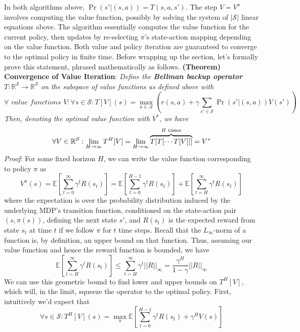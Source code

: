 \documentclass{article}
\begin{document}
In both algorithms above, $ \Pr(s' | (s, a)) = T(s, a, s') $. The step $ V = V^\pi $ involves computing the value function, possibly by solving the system of $ | \mathcal{S} | $ linear equations above. The algorithm essentially computes the value function for the current policy, then updates by re-selecting $ \pi $'s state-action mapping depending on the value function. Both value and policy iteration are guaranteed to converge to the optimal policy in finite time.
\newline \newline
Before wrapping up the section, let's formally prove this statement, phrased mathematically as follows.
\newline \newline
\textbf{(Theorem) Convergence of Value Iteration}: \textit{Define the \textbf{Bellman backup operator} $ T: \mathbb{R}^\mathcal{S} \rightarrow \mathbb{R}^\mathcal{S} $ on the subspace of value functions as defined above with}
    $$ \forall \textit{ value functions } V: \forall s \in \mathcal{S}: T[V](s) = \max_{a \in \mathcal{A}} \left( r(s, a) + \gamma \sum_{s' \in \mathcal{S}} \Pr(s' | (s, a)) V(s') \right) $$
\textit{Then, denoting the optimal value function with $ V^* $, we have}
    $$ \forall V \in \mathbb{R}^\mathcal{S}: \lim_{H \to \infty} T^H[V] = \lim_{H \to \infty} \overbrace{T[T[\cdots T[V]]]}^\text{$ H $ times} = V^* $$
\indent \textit{Proof}: For some fixed horizon $ H $, we can write the value function corresponding to policy $ \pi $ as
    $$ V^\pi(s) = \mathbb{E} \left[ \sum_{t = 0}^\infty \gamma^t R(s_t) \right] = \mathbb{E} \left[ \sum_{t = 0}^{H - 1} \gamma^t R(s_t) \right] + \mathbb{E} \left[ \sum_{t = H}^\infty \gamma^t R(s_t) \right] $$
where the expectation is over the probability distribution induced by the underlying MDP's transition function, conditioned on the state-action pair $ (s, \pi(s)) $, defining the next state $ s' $, and $ R(s_t) $ is the expected reward from state $ s_t $ at time $ t $ if we follow $ \pi $ for $ t $ time steps. Recall that the $ L_\infty $-norm of a function is, by definition, an upper bound on that function. Thus, assuming our value function and hence the reward function is bounded, we have
    $$ \mathbb{E} \left[ \sum_{t = H}^\infty \gamma^t R(s_t) \right] \leq \sum_{t = H}^\infty \gamma^t || R ||_\infty = \frac{\gamma^H}{1 - \gamma} || R ||_\infty $$
We can use this geometric bound to find lower and upper bounds on $ T^H[V] $, which will, in the limit, squeeze the operator to the optimal policy. First, intuitively we'd expect that
    $$ \forall s \in \mathcal{S}: T^H[V](s) = \max_\pi \mathbb{E} \left[ \sum_{t = 0}^{H - 1} \gamma^t R(s_t) + \gamma^H V(s) \right] $$
\end{document}

